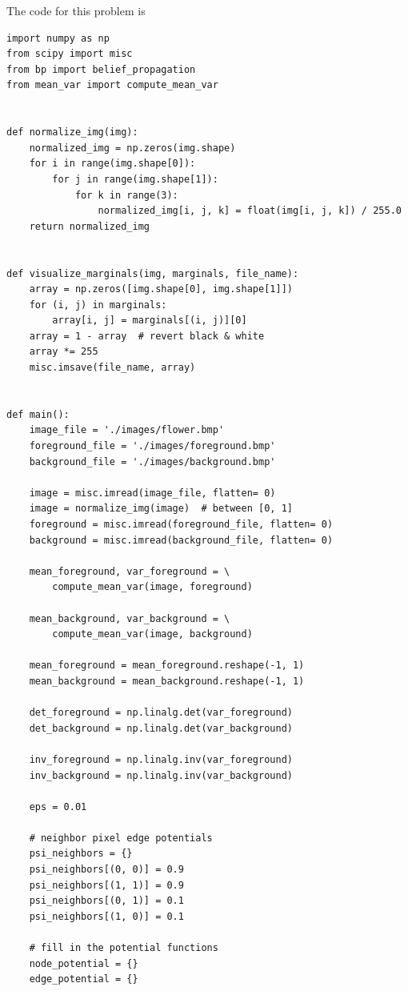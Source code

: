 \documentclass{article}
\begin{document}
\pagebreak
The code for this problem is
\lstset{language=Python}
\lstset{frame=lines}
\lstset{basicstyle=\footnotesize}
\begin{lstlisting}
import numpy as np
from scipy import misc
from bp import belief_propagation
from mean_var import compute_mean_var


def normalize_img(img):
    normalized_img = np.zeros(img.shape)
    for i in range(img.shape[0]):
        for j in range(img.shape[1]):
            for k in range(3):
                normalized_img[i, j, k] = float(img[i, j, k]) / 255.0
    return normalized_img


def visualize_marginals(img, marginals, file_name):
    array = np.zeros([img.shape[0], img.shape[1]])
    for (i, j) in marginals:
        array[i, j] = marginals[(i, j)][0]
    array = 1 - array  # revert black & white
    array *= 255
    misc.imsave(file_name, array)


def main():
    image_file = './images/flower.bmp'
    foreground_file = './images/foreground.bmp'
    background_file = './images/background.bmp'

    image = misc.imread(image_file, flatten= 0)
    image = normalize_img(image)  # between [0, 1]
    foreground = misc.imread(foreground_file, flatten= 0)
    background = misc.imread(background_file, flatten= 0)

    mean_foreground, var_foreground = \
        compute_mean_var(image, foreground)

    mean_background, var_background = \
        compute_mean_var(image, background)

    mean_foreground = mean_foreground.reshape(-1, 1)
    mean_background = mean_background.reshape(-1, 1)

    det_foreground = np.linalg.det(var_foreground)
    det_background = np.linalg.det(var_background)

    inv_foreground = np.linalg.inv(var_foreground)
    inv_background = np.linalg.inv(var_background)

    eps = 0.01

    # neighbor pixel edge potentials
    psi_neighbors = {}
    psi_neighbors[(0, 0)] = 0.9
    psi_neighbors[(1, 1)] = 0.9
    psi_neighbors[(0, 1)] = 0.1
    psi_neighbors[(1, 0)] = 0.1

    # fill in the potential functions
    node_potential = {}
    edge_potential = {}


\end{lstlisting}
\end{document}
